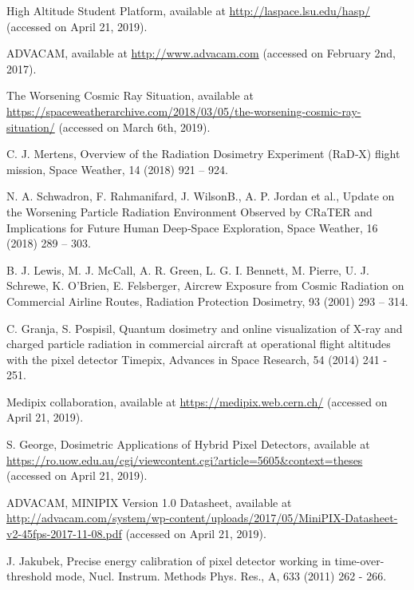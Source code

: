 \begin{thebibliography}{00}
  High Altitude Student Platform, available at \url{http://laspace.lsu.edu/hasp/} (accessed on April 21, 2019).

  ADVACAM, available at \url{http://www.advacam.com} (accessed on February 2nd, 2017).
  
The Worsening Cosmic Ray Situation, available at \url{https://spaceweatherarchive.com/2018/03/05/the-worsening-cosmic-ray-situation/} (accessed on March 6th, 2019).  

 C. J. Mertens, Overview of the Radiation Dosimetry Experiment (RaD‐X) flight mission, Space Weather, 14 (2018) 921 – 924.  
  
 N. A. Schwadron, F. Rahmanifard, J. WilsonB., A. P. Jordan et al., Update on the Worsening Particle Radiation Environment Observed by CRaTER and Implications for Future Human Deep‐Space Exploration, Space Weather, 16 (2018) 289 – 303.  
  
 B. J. Lewis, M. J. McCall, A. R. Green, L. G. I. Bennett, M. Pierre, U. J. Schrewe, K. O'Brien, E. Felsberger, Aircrew Exposure from Cosmic Radiation on Commercial Airline Routes, Radiation Protection Dosimetry, 93 (2001) 293 – 314.
  
 C. Granja, S. Pospisil, Quantum dosimetry and online visualization of X-ray and charged particle radiation in commercial aircraft at operational flight altitudes with the pixel detector Timepix, Advances in Space Research, 54 (2014) 241 - 251.

  Medipix collaboration, available at \url{https://medipix.web.cern.ch/} (accessed on April 21, 2019).
  
  S. George, Dosimetric Applications of Hybrid Pixel Detectors, available at \url{https://ro.uow.edu.au/cgi/viewcontent.cgi?article=5605&context=theses} (accessed on April 21, 2019).

  ADVACAM, MINIPIX Version 1.0 Datasheet, available at \url{http://advacam.com/system/wp-content/uploads/2017/05/MiniPIX-Datasheet-v2-45fps-2017-11-08.pdf} (accessed on April 21, 2019).  

  J. Jakubek, Precise energy calibration of pixel detector working in time-over-threshold mode, Nucl. Instrum. Methods Phys. Res., A, 633 (2011) 262 - 266.


\end{thebibliography}
